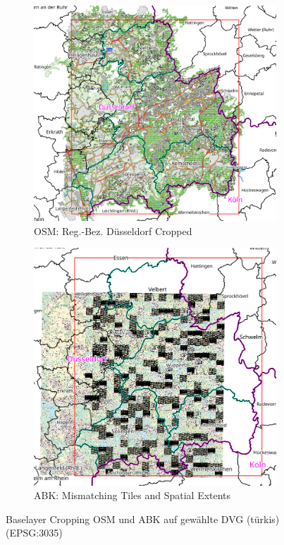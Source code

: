		\begin{figure}[H]
			\begin{subfigure}{0.45\linewidth}
				\includegraphics[width=\linewidth]{Medien/own/qgis_dvg_regbez_gem_spatial_extents_osm_1_500000.png}
				\caption{OSM: Reg.-Bez. Düsseldorf Cropped}
				\label{fig:qgis_baselayer_osm_spatial_extents}
			\end{subfigure}
			\begin{subfigure}{0.45\linewidth}
				\includegraphics[width=\linewidth]{Medien/own/qgis_dvg_regbez_gem_spatial_extents_abk_1_500000.png}
				\caption{ABK: Mismatching Tiles and Spatial Extents}
				\label{fig:qgis_baselayer_abk_spatial_extents}
			\end{subfigure}
			\caption{Baselayer Cropping OSM und ABK auf gewählte DVG (türkis) (EPSG:3035)}
			\label{fig:qgis_baselayer_cropping}
		\end{figure}
		
